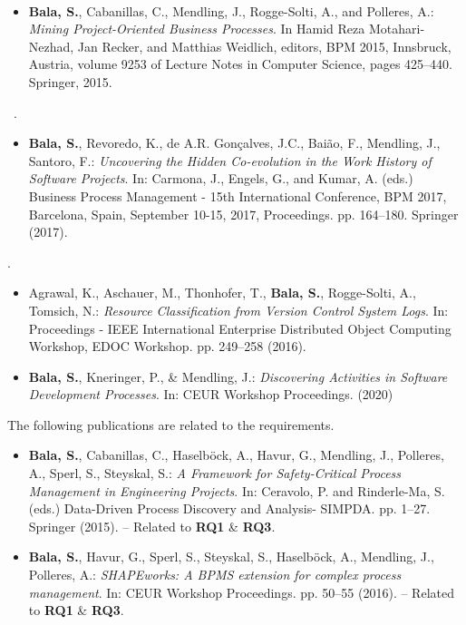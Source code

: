 ~\citep{DBLP:conf/bpm/BalaCMRP15}
\begin{itemize}
\item \textbf{Bala, S.}, Cabanillas, C., Mendling, J., Rogge-Solti, A., and Polleres, A.: \textit{Mining Project-Oriented Business Processes}. In Hamid Reza Motahari-Nezhad, Jan Recker, and Matthias Weidlich, editors, BPM 2015, Innsbruck, Austria, volume 9253 of Lecture Notes in Computer Science, pages 425--440. Springer, 2015. 
\end{itemize}	
~\citep{DBLP:conf/bpm/BalaRGBMS17}.
\begin{itemize}
	\item \textbf{Bala, S.}, Revoredo, K., de A.R. Gonçalves, J.C., Baião, F., Mendling, J., Santoro, F.: \textit{Uncovering the Hidden Co-evolution in the Work History of Software Projects}. In: Carmona, J., Engels, G., and Kumar, A. (eds.) Business Process Management - 15th International Conference, BPM 2017, Barcelona, Spain, September 10-15, 2017, Proceedings. pp. 164--180. Springer (2017). 
\end{itemize}
 \citep{DBLP:conf/edoc/AgrawalATBRT16}.
\begin{itemize}
	\item Agrawal, K., Aschauer, M., Thonhofer, T., \textbf{Bala, S.}, Rogge-Solti, A., Tomsich, N.: \textit{Resource Classification from Version Control System Logs}. In: Proceedings - IEEE International Enterprise Distributed Object Computing Workshop, EDOC Workshop. pp. 249--258 (2016). 
\end{itemize}
 \citep{DBLP:conf/ifip8-1/BalaKM20}
\begin{itemize}
	\item \textbf{Bala, S.}, Kneringer, P., \& Mendling, J.: \textit{Discovering Activities in Software Development Processes}. In: CEUR Workshop Proceedings. (2020)
\end{itemize}

\noindent The following publications are related to the requirements.
\begin{itemize}
	
\item \textbf{Bala, S.}, Cabanillas, C., Haselböck, A., Havur, G., Mendling, J., Polleres, A., Sperl, S., Steyskal, S.: \textit{A Framework for Safety-Critical Process Management in Engineering Projects}. In: Ceravolo, P. and Rinderle-Ma, S. (eds.) Data-Driven Process Discovery and Analysis- SIMPDA. pp. 1--27. Springer (2015). \cite[]{Bala2017} -- Related to \textbf{RQ1} \& \textbf{RQ3}.
	
\item \textbf{Bala, S.}, Havur, G., Sperl, S., Steyskal, S., Haselböck, A., Mendling, J., Polleres, A.: \textit{SHAPEworks: A BPMS extension for complex process management}. In: CEUR Workshop Proceedings. pp. 50--55 (2016). \cite[]{Bala2016} -- Related to \textbf{RQ1} \& \textbf{RQ3}.
	
\end{itemize}

